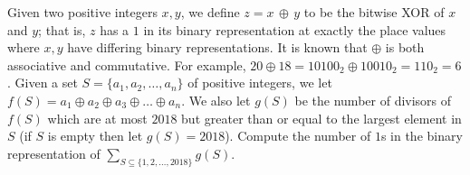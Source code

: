 Given two positive integers $x,y$, we define $z=x\,\oplus\,y$ to be the bitwise XOR of $x$ and $y$; that is, $z$ has a $1$ in its binary representation at exactly the place values where $x,y$ have differing binary representations. It is known that $\oplus$ is both associative and commutative. For example, $20 \oplus 18 = 10100_2 \oplus 10010_2 = 110_2 = 6$. Given a set $S=\{a_1, a_2, \dots, a_n\}$ of positive integers, we let $f(S) = a_1 \oplus a_2 \oplus a_3\oplus \dots \oplus a_n$. We also let $g(S)$ be the number of divisors of $f(S)$ which are at most $2018$ but greater than or equal to the largest element in $S$ (if $S$ is empty then let $g(S)=2018$). Compute the number of $1$s in the binary representation of $\displaystyle\sum_{S\subseteq \{1,2,\dots, 2018\}} g(S)$.

